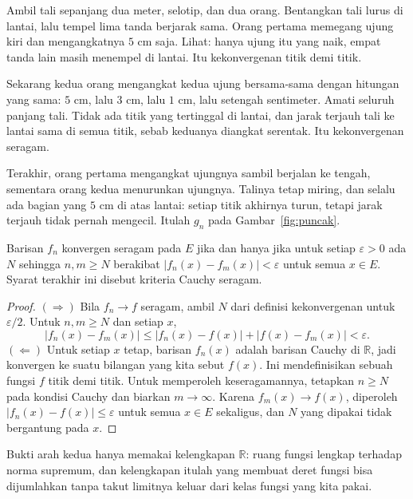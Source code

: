 \begin{tangan}
Ambil tali sepanjang dua meter, selotip, dan dua orang. Bentangkan tali lurus di
lantai, lalu tempel lima tanda berjarak sama. Orang pertama memegang ujung kiri
dan mengangkatnya $5$ cm saja. Lihat: hanya ujung itu yang naik, empat tanda
lain masih menempel di lantai. Itu kekonvergenan titik demi titik.

Sekarang kedua orang mengangkat kedua ujung bersama-sama dengan hitungan yang
sama: $5$ cm, lalu $3$ cm, lalu $1$ cm, lalu setengah sentimeter. Amati seluruh
panjang tali. Tidak ada titik yang tertinggal di lantai, dan jarak terjauh tali
ke lantai sama di semua titik, sebab keduanya diangkat serentak. Itu
kekonvergenan seragam.

Terakhir, orang pertama mengangkat ujungnya sambil berjalan ke tengah, sementara
orang kedua menurunkan ujungnya. Talinya tetap miring, dan selalu ada bagian
yang $5$ cm di atas lantai: setiap titik akhirnya turun, tetapi jarak terjauh
tidak pernah mengecil. Itulah $g_n$ pada Gambar~\ref{fig:puncak}.
\end{tangan}

\begin{lemma}
Barisan $f_n$ konvergen seragam pada $E$ jika dan hanya jika untuk setiap
$\varepsilon>0$ ada $N$ sehingga $n,m\ge N$ berakibat
$|f_n(x)-f_m(x)|<\varepsilon$ untuk semua $x\in E$. Syarat terakhir ini disebut
kriteria Cauchy seragam.
\end{lemma}

\begin{proof}
$(\Rightarrow)$ Bila $f_n\to f$ seragam, ambil $N$ dari definisi kekonvergenan
untuk $\varepsilon/2$. Untuk $n,m\ge N$ dan setiap $x$,
\[
  |f_n(x)-f_m(x)|\le|f_n(x)-f(x)|+|f(x)-f_m(x)|<\varepsilon .
\]
$(\Leftarrow)$ Untuk setiap $x$ tetap, barisan $f_n(x)$ adalah barisan Cauchy
di $\mathbb{R}$, jadi konvergen ke suatu bilangan yang kita sebut $f(x)$. Ini
mendefinisikan sebuah fungsi $f$ titik demi titik. Untuk memperoleh
keseragamannya, tetapkan $n\ge N$ pada kondisi Cauchy dan biarkan
$m\to\infty$. Karena $f_m(x)\to f(x)$, diperoleh $|f_n(x)-f(x)|\le\varepsilon$
untuk semua $x\in E$ sekaligus, dan $N$ yang dipakai tidak bergantung pada $x$.
\end{proof}

Bukti arah kedua hanya memakai kelengkapan $\mathbb{R}$: ruang fungsi lengkap
terhadap norma supremum, dan kelengkapan itulah yang membuat deret fungsi bisa
dijumlahkan tanpa takut limitnya keluar dari kelas fungsi yang kita pakai.

